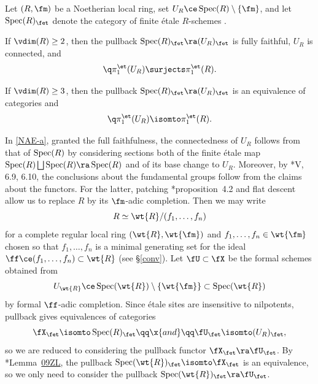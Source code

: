 \bthm {}
Let $(R, \fm)$ be a Noetherian local ring, set $U_R \ce \Spec(R) \setminus \{ \fm\}$, and let $\Spec(R)_\fet$  denote the category of finite \'{e}tale $R$-schemes .
\benum
\item {}
If $\vdim(R) \ge 2$, then the pullback $\Spec(R)_\fet \ra (U_{R})_\fet$ is fully faithful, $U_R$ is connected, and
\[
\q \pi_1^\et(U_R) \surjects \pi_1^\et(R).
\]

\item {}
If $\vdim(R) \ge 3$, then the pullback $\Spec(R)_\fet \ra (U_{R})_\fet$ is an equivalence of categories and
\[
\q \pi_1^\et(U_R) \isomto \pi_1^\et(R).
\]
\eenum
\ethm


\bpf
In \ref{NAE-a}, granted the full faithfulness, the connectedness of $U_R$ follows from that of $\operatorname{Spec}(R)$  by considering sections both of the finite \'{e}tale map $\Spec(R) \bigsqcup \Spec(R) \ra \Spec(R)$ and of its base change to $U_R$. Moreover, by \cite{SGA1new}*{V, 6.9, 6.10}, %
the conclusions about the fundamental groups follow from the claims about the functors. For the latter, patching \cite{FR70}*{proposition~4.2} and flat descent allow us to replace $R$ by its $\fm$-adic completion. Then we may write
\[
R \simeq \wt{R}/(f_1, \dotsc, f_n)
\]
for a complete regular local ring $(\wt{R}, \wt{\fm})$ and $f_1, \dotsc, f_n \in \wt{\fm}$ chosen so that $f_1, \dotsc, f_n$ is a minimal generating set for the ideal $\ff \ce (f_1, \dotsc, f_n) \subset \wt{R}$ (see \S\ref{conv}). Let $\fU \subset \fX$ be the formal schemes obtained from
\[
U_{\wt{R}} \ce \Spec(\wt{R}) \setminus \{ \wt{\fm}\} \subset  \Spec(\wt{R})
\]
 by formal $\ff$-adic completion. %
Since  \'{e}tale sites are insensitive to nilpotents, pullback gives equivalences of categories
\[
\fX_\fet \isomto \Spec(R)_\fet \qq \x{and} \qq \fU_\fet \isomto (U_{R})_\fet,
\]
so we are reduced to considering the pullback functor $\fX_\fet \ra \fU_\fet$. By \cite{SP}*{Lemma~\href{https://stacks.math.columbia.edu/tag/09ZL}{09ZL}}, %
the pullback $\Spec(\wt{R})_\fet \isomto \fX_\fet$ is an equivalence, so we only need to consider the pullback $\Spec(\wt{R})_\fet \ra \fU_\fet$.

